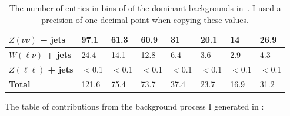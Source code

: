 \begin{table}[H]
\begin{tabular}{|l|lllllll|}
    \textbf{$Z(\nu\nu)$ + jets} & 97.1    & 61.3    & 60.9     & 31      & 20.1     & 14        & 26.9    \\ \hline
    \textbf{$W(\ell\nu)$ + jets} & 24.4    & 14.1    & 12.8     & 6.4     & 3.6      & 2.9       & 4.3     \\ \hline
    \textbf{$Z(\ell\ell)$ + jets} & $<$0.1   & $<$0.1   & $<$0.1    & $<$0.1   & $<$0.1    & $<$0.1     & $<$0.1   \\ \hline
    \textbf{Total}        & 121.6 & 75.4  & 73.7   & 37.4  & 23.7   & 16.9    & 31.2  \\ \hline
    \end{tabular}
    \caption{The number of entries in bins of \etmiss of the dominant backgrounds in~\cite{CMS:2016pod}. I used a precision of one decimal point when copying these values.}
    \label{tab:cmspaper}
\end{table}

The table of contributions from the background process I generated in \madgraph:

